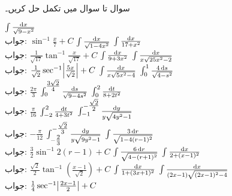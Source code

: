 \\
سوال  تا سوال  میں تکمل حل کریں۔

$\int\tfrac{\dif x}{\sqrt{9-x^2}}$\\
جواب:\quad
$\sin^{-1}\tfrac{x}{7}+C$
$\int\tfrac{\dif x}{\sqrt{1-4x^2}}$
$\int\tfrac{\dif x}{17+x^2}$\\
جواب:\quad
$\tfrac{1}{\sqrt{17}}\tan^{-1}\tfrac{x}{\sqrt{17}}+C$
$\int\tfrac{\dif x}{9+3x^2}$
$\int\tfrac{\dif x}{x\sqrt{25x^2-2}}$\\
جواب:\quad
$\tfrac{1}{\sqrt{2}}\sec^{-1}\abs{\tfrac{5x}{\sqrt{2}}}+C$
$\int\tfrac{\dif x}{x\sqrt{5x^2-4}}$
$\int_0^1\tfrac{4\dif s}{\sqrt{4-s^2}}$\\
جواب:\quad
$\tfrac{2\pi}{3}$
$\int_0^{\tfrac{3\sqrt{2}}{4}}\tfrac{\dif s}{\sqrt{9-4s^2}}$
$\int_0^2\tfrac{\dif t}{8+2t^2}$\\
جواب:\quad
$\tfrac{\pi}{16}$
$\int_{-2}^2\tfrac{\dif t}{4+3t^2}$
$\int_{-1}^{-\tfrac{\sqrt{2}}{2}}\tfrac{\dif y}{y\sqrt{4y^2-1}}$\\
جواب:\quad
$-\tfrac{\pi}{12}$
$\int_{-\tfrac{2}{3}}^{-\tfrac{\sqrt{2}}{3}}\tfrac{\dif y}{y\sqrt{9y^2-1}}$
$\int\tfrac{3\dif r}{\sqrt{1-4(r-1)^2}}$\\
جواب:\quad
$\tfrac{3}{2}\sin^{-1}2(r-1)+C$
$\int\tfrac{6\dif r}{\sqrt{4-(r+1)^2}}$
$\int\tfrac{\dif x}{2+(x-1)^2}$\\
جواب:\quad
$\tfrac{\sqrt{2}}{2}\tan^{-1}(\tfrac{x-1}{\sqrt{2}})+C$
$\int\tfrac{\dif x}{1+(3x+1)^2}$
$\int\tfrac{\dif x}{(2x-1)\sqrt{(2x-1)^2-4}}$\\
جواب:\quad
$\tfrac{1}{4}\sec^{-1}\abs{\tfrac{2x-1}{2}}+C$
